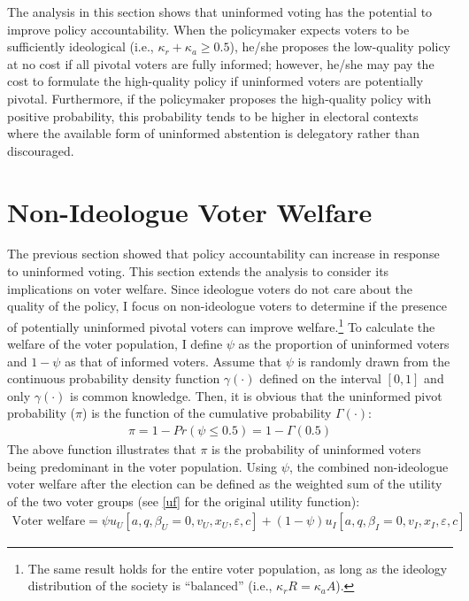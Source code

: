 \documentclass[doc,natbib,12pt]{apa6}
\begin{document}
	\par The analysis in this section shows that uninformed voting has the potential to improve policy accountability. When the policymaker expects voters to be sufficiently ideological (i.e., $\kappa_{r}+\kappa_{a}\geq0.5$), he/she proposes the low-quality policy at no cost if all pivotal voters are fully informed; however, he/she may pay the cost to formulate the high-quality policy if uninformed voters are potentially pivotal. Furthermore, if the policymaker proposes the high-quality policy with positive probability, this probability tends to be higher in electoral contexts where the available form of uninformed abstention is delegatory rather than discouraged.
	
	\section{Non-Ideologue Voter Welfare}
	
	\par The previous section showed that policy accountability can increase in response to uninformed voting. This section extends the analysis to consider its implications on voter welfare. Since ideologue voters do not care about the quality of the policy, I focus on non-ideologue voters to determine if the presence of potentially uninformed pivotal voters can improve welfare.\footnote{The same result holds for the entire voter population, as long as the ideology distribution of the society is ``balanced'' (i.e., $\kappa_r R = \kappa_a A$).} To calculate the welfare of the voter population, I define $\psi$ as the proportion of uninformed voters and $1-\psi$ as that of informed voters. Assume that $\psi$ is randomly drawn from the continuous probability density function $\gamma(\cdot)$ defined on the interval $[0, 1]$ and 
	only $\gamma(\cdot)$ is common knowledge. Then, it is obvious that the uninformed pivot probability ($\pi$) is the function of the cumulative probability $\Gamma(\cdot)$:
	\begin{align}
	\pi = 1 - Pr(\psi \leq 0.5) = 1 - \Gamma(0.5)
	\end{align}
	\noindent The above function illustrates that $\pi$ is the probability of uninformed voters being predominant in the voter population. Using $\psi$, the combined non-ideologue voter welfare after the election can be defined as the weighted sum of the utility of the two voter groups (see \autoref{uf} for the original utility function):
	\begin{align}
	\text{Voter welfare} = \psi u_U [a,q,\beta_U=0,v_U,x_U,\varepsilon,c]  + (1-\psi) u_I [a,q,\beta_I=0,v_I,x_I,\varepsilon,c]
	\end{align}
	
\end{document}

